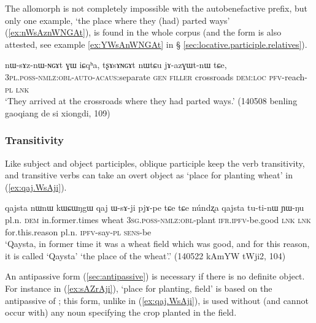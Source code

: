 The  allomorph is not completely impossible with the autobenefactive  prefix, but only one example,  `the place where they (had) parted ways' (\ref{ex:nWsAznWNGAt}), is found in the whole corpus (and the form  is also attested, see example \ref{ex:YWsAnWNGAt} in § \ref{sec:locative.participle.relatives}).

\begin{exe}
\ex \label{ex:nWsAznWNGAt}
\gll  nɯ-sɤz-nɯ-ɴɢɤt ɣɯ iɕqʰa, tʂɤsɤɴɢɤt nɯtɕu jɤ-azɣɯt-nɯ tɕe, \\
\textsc{3pl}.\textsc{poss}-\textsc{nmlz}:\textsc{obl}-\textsc{auto}-\textsc{acaus}:separate \textsc{gen} \textsc{filler}  crossroads \textsc{dem}:\textsc{loc} \textsc{pfv}-reach-\textsc{pl} \textsc{lnk} \\
\glt `They arrived at the crossroads where they had parted ways.' (140508 benling gaoqiang de si xiongdi, 109)
\end{exe} 

\subsubsection{Transitivity} \label{sec:oblique.participle.transitivity}
Like subject and object participles, oblique participle keep the verb transitivity, and transitive verbs can take an overt object as  `place for planting wheat' in (\ref{ex:qaj.WsAji}).

\begin{exe}
\ex \label{ex:qaj.WsAji}
\gll  qajsta nɯnɯ kɯɕɯŋgɯ qaj ɯ-sɤ-ji pjɤ-pe tɕe tɕe núndʐa qajsta tu-ti-nɯ ɲɯ-ŋu \\
pl.n. \textsc{dem} in.former.times wheat \textsc{3sg}.\textsc{poss}-\textsc{nmlz}:\textsc{obl}-plant \textsc{ifr}.\textsc{ipfv}-be.good \textsc{lnk} \textsc{lnk} for.this.reason pl.n. \textsc{ipfv}-say-\textsc{pl} \textsc{sens}-be \\
\glt `Qaysta, in former time it was a wheat field which was good, and for this reason, it is called `Qaysta' `the place of the wheat'.' (140522 kAmYW tWji2, 104)
\end{exe}

An antipassive form (\ref{sec:antipassive}) is necessary if there is no definite object. For instance in (\ref{ex:sAZrAji}),  `place for planting, field' is based on the  antipassive of ; this form, unlike  in (\ref{ex:qaj.WsAji}), is used without (and cannot occur with) any noun specifying the crop planted in the field.

